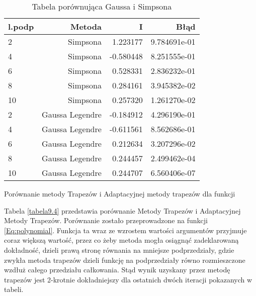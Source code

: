 \documentclass[12pt,twoside]{article}
\begin{document}
\begin{table}
\centering 
\caption{Tabela porównująca Gaussa i Simpsona }
\label{tabela9.3}
\begin{tabular}{lrrr}
\toprule
{l.podp} & Metoda &  I &  Błąd \\
\midrule
2  &     Simpsona & 1.223177 &   9.784691e-01 \\
4  &     Simpsona & -0.580448  &   8.251555e-01  \\
6  &     Simpsona &  0.528331  &   2.836232e-01  \\
8  &     Simpsona & 0.284161 &   3.945382e-02  \\
10 &     Simpsona & 0.257320 &   1.261270e-02  \\
2  &     Gaussa Legendre & -0.184912 &  4.296190e-01   \\
4  &     Gaussa Legendre & -0.611561 &  8.562686e-01   \\
6  &     Gaussa Legendre & 0.212634 &  3.207296e-02   \\
8  &     Gaussa Legendre & 0.244457 &  2.499462e-04  \\
10 &     Gaussa Legendre & 0.244707 &  6.560406e-07  \\

\bottomrule
\end{tabular}
\end{table}




Porównanie metody Trapezów i Adaptacyjnej metody trapezów dla funkcji 

Tabela \eqref{tabela9.4} przedstawia porównanie Metody Trapezów i Adaptacyjnej Metody Trapezów. Porównanie zostało przeprowadzone na funkcji \eqref{Eq:polynomial}. Funkcja ta wraz ze wzrostem wartości argumentów przyjmuje coraz większą wartość, przez co żeby metoda mogła osiągnąć zadeklarowaną dokładność, dzieli prawą stronę równania na mniejsze podprzedziały, gdzie zwykła metoda trapezów dzieli funkcję na podprzedziały równo rozmieszczone wzdłuż całego przedziału całkowania. Stąd wynik uzyskany przez metodę trapezów jest 2-krotnie dokładniejszy dla ostatnich dwóch iteracji pokazanych w tabeli.
\end{document}
